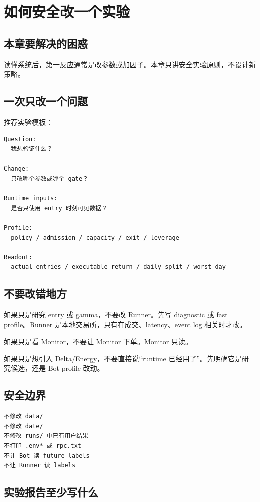 \chapter{如何安全改一个实验}

\section{本章要解决的困惑}

读懂系统后，第一反应通常是改参数或加因子。本章只讲安全实验原则，不设计新策略。

\section{一次只改一个问题}

推荐实验模板：

\begin{lstlisting}
Question:
  我想验证什么？

Change:
  只改哪个参数或哪个 gate？

Runtime inputs:
  是否只使用 entry 时刻可见数据？

Profile:
  policy / admission / capacity / exit / leverage

Readout:
  actual_entries / executable return / daily split / worst day
\end{lstlisting}

\section{不要改错地方}

如果只是研究 entry 或 gamma，不要改 Runner。先写 diagnostic 或 fast profile。Runner 是本地交易所，只有在成交、latency、event log 相关时才改。

如果只是看 Monitor，不要让 Monitor 下单。Monitor 只读。

如果只是想引入 Delta/Energy，不要直接说“runtime 已经用了”。先明确它是研究候选，还是 Bot profile 改动。

\section{安全边界}

\begin{lstlisting}
不修改 data/
不修改 date/
不修改 runs/ 中已有用户结果
不打印 .env* 或 rpc.txt
不让 Bot 读 future labels
不让 Runner 读 labels
\end{lstlisting}

\section{实验报告至少写什么}

